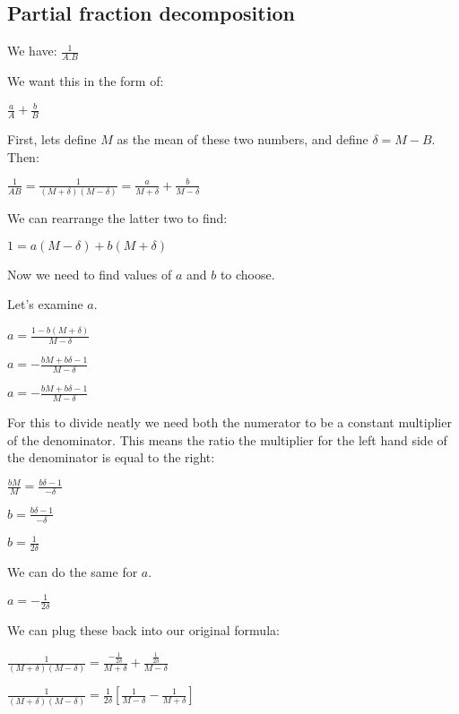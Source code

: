 \subsection{Partial fraction decomposition}

We have:
\(\frac{1}{A.B}\)

We want this in the form of:

\(\frac{a}{A}+\frac{b}{B}\)

First, lets define \(M\) as the mean of these two numbers, and define \(\delta=M-B\). Then:

\(\frac{1}{AB}=\frac{1}{(M+\delta)(M-\delta)}=\frac{a}{M+\delta}+\frac{b}{M-\delta}\)

We can rearrange the latter two to find:

\(1=a(M-\delta)+b(M+\delta)\)

Now we need to find values of \(a\) and \(b\) to choose.

Let's examine \(a\).

\(a=\frac{1-b(M+\delta)}{M-\delta}\)

\(a=-\frac{bM+b\delta -1}{M-\delta}\)

\(a=-\frac{bM+b\delta -1}{M-\delta}\)

For this to divide neatly we need both the numerator to be a constant multiplier of the denominator. This means the ratio the multiplier for the left hand side of the denominator is equal to the right:

\(\frac{bM}{M}=\frac{b\delta -1}{-\delta}\)

\(b=\frac{b\delta -1}{-\delta}\)

\(b=\frac{1}{2\delta}\)

We can do the same for \(a\).

\(a=-\frac{1}{2\delta}\)

We can plug these back into our original formula:

\(\frac{1}{(M+\delta)(M-\delta)}=\frac{-\frac{1}{2\delta}}{M+\delta}+\frac{\frac{1}{2\delta}}{M-\delta}\)

\(\frac{1}{(M+\delta)(M-\delta)}=\frac{1}{2\delta}[\frac{1}{M-\delta}-\frac{1}{M+\delta}]\)

